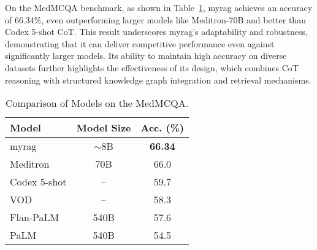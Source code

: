 On the MedMCQA benchmark, as shown in Table~\ref{tab:medmcqa_comparison}, \gls{myrag} achieves an accuracy of 66.34\%, even outperforming larger models like Meditron-70B and better than Codex 5-shot CoT. This result underscores \gls{myrag}'s adaptability and robustness, demonstrating that it can deliver competitive performance even against significantly larger models. Its ability to maintain high accuracy on diverse datasets further highlights the effectiveness of its design, which combines CoT reasoning with structured knowledge graph integration and retrieval mechanisms.



\begin{table}[h!]
\small
\centering
\caption{Comparison of Models on the MedMCQA.}
\label{tab:medmcqa_comparison}
\renewcommand{\arraystretch}{0.9}

\begin{tabular}{@{}lcc@{}}
\toprule
\textbf{Model}                              & \textbf{Model Size}           & \textbf{ Acc. (\%)} \\
\midrule
\gls{myrag}                 & $\sim$8B                                     & \textbf{66.34}\\
Meditron \citep{chen2023meditron}                     & 70B                          & 66.0 \\

Codex 5-shot \citep{lievin2024can}                            & --                           & 59.7 \\
VOD \citep{lievin2023variational}                           & --                           & 58.3 \\
Flan-PaLM \citep{singhal2022large}                        & 540B                         & 57.6 \\
PaLM                       & 540B                         & 54.5 \\


\end{tabular}
\end{table}
